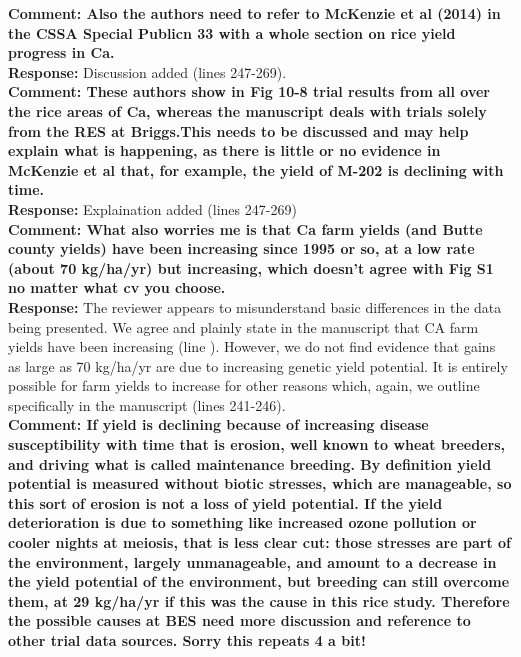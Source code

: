 \documentclass{article} \usepackage[margin=1in]{geometry}
\begin{document}
\textbf{Comment: Also the authors need to refer to McKenzie et al (2014) in the CSSA
  Special Publicn 33 with a whole section on rice yield progress in
  Ca.}\\

\textbf{Response:} Discussion added (lines 247-269). \\

\textbf{Comment: These authors show in Fig 10-8 trial results from all over the
  rice areas of Ca, whereas the manuscript deals with trials solely
  from the RES at Briggs.This needs to be discussed and may help
  explain what is happening, as there is little or no evidence in
  McKenzie et al that, for example, the yield of M-202 is declining
  with time.}\\

\textbf{Response:} Explaination added (lines 247-269)\\

\textbf{Comment: What also worries me is that Ca farm yields (and Butte
  county yields) have been increasing since 1995 or so, at a low rate
  (about 70 kg/ha/yr) but increasing, which doesn’t agree with Fig S1
  no matter what cv you choose.}\\

\textbf{Response:} The reviewer appears to misunderstand basic
differences in the data being presented. We agree and plainly state in
the manuscript that CA farm yields have been increasing (line
). However, we do not find evidence that gains as large as 70 kg/ha/yr
are due to increasing genetic yield potential. It is entirely possible
for farm yields to increase for other reasons which, again, we outline
specifically in the manuscript (lines 241-246).\\

\textbf{Comment: If yield is declining because of increasing disease susceptibility
  with time that is erosion, well known to wheat breeders, and driving
  what is called maintenance breeding. By definition yield potential is
  measured without biotic stresses, which are manageable, so this sort
  of erosion is not a loss of yield potential. If the yield
  deterioration is due to something like increased ozone pollution or
  cooler nights at meiosis, that is less clear cut: those stresses are
  part of the environment, largely unmanageable, and amount to a
  decrease in the yield potential of the environment, but breeding can
  still overcome them, at 29 kg/ha/yr if this was the cause in this rice
  study. Therefore the possible causes at BES need more discussion and
  reference to other trial data sources. Sorry this repeats 4 a bit!}\\
\end{document}
